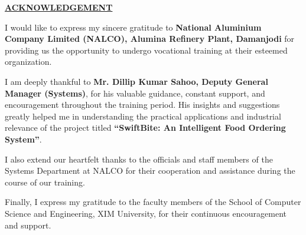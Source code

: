 \begin{center}

\vspace{1cm}

\textbf{\underline{ACKNOWLEDGEMENT}}

\end{center}

\vspace{1cm}

\begin{doublespace}

I would like to express my sincere gratitude to 
\textbf{National Aluminium Company Limited (NALCO), Alumina Refinery Plant, Damanjodi} 
for providing us the opportunity to undergo vocational training at their esteemed organization.

I am deeply thankful to 
\textbf{Mr. Dillip Kumar Sahoo, Deputy General Manager (Systems)}, 
for his valuable guidance, constant support, and encouragement throughout the training period. His insights and suggestions greatly helped me in understanding the practical applications and industrial relevance of the project titled 
\textbf{``SwiftBite: An Intelligent Food Ordering System''}.

I also extend our heartfelt thanks to the officials and staff members of the Systems Department at NALCO for their cooperation and assistance during the course of our training.

Finally, I express my gratitude to the faculty members of the School of Computer Science and Engineering, XIM University, for their continuous encouragement and support.

\vspace{1cm}




\end{doublespace}